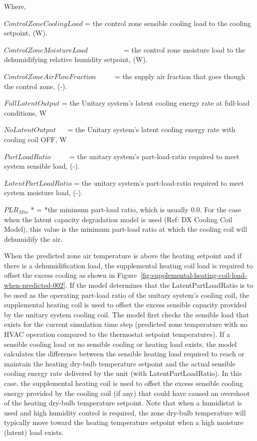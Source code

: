 Where,

\(ControlZoneCoolingLoad\) = the control zone sensible cooling load to the cooling setpoint, (W).

\(ControlZoneMoistureLoad\) ~~~~~~~~~ = the control zone moisture load to the dehumidifying relative humidity setpoint, (W).

\(ControlZoneAirFlowFraction\) ~~~~ = the supply air fraction that goes though the control zone, (-).

\(FullLatentOutput\) = the Unitary system's latent cooling energy rate at full-load conditions, W

\(NoLatentOutput\) ~~ = the Unitary system's latent cooling energy rate with cooling coil OFF, W

\(PartLoadRatio\) ~~~~ = the unitary system's part-load-ratio required to meet system sensible load, (-).

\(LatentPartLoadRatio\) = the unitary system's part-load-ratio required to meet system moisture load, (-).

\(PL{R_{Min}}\) * = *the minimum part-load ratio, which is usually 0.0. For the case when the latent capacity degradation model is used (Ref: DX Cooling Coil Model), this value is the minimum part-load ratio at which the cooling coil will dehumidify the air.

When the predicted zone air temperature is above the heating setpoint and if there is a dehumidification load, the supplemental heating coil load is required to offset the excess cooling as shown in Figure~\ref{fig:supplemental-heating-coil-load-when-predicted-002}. If the model determines that the LatentPartLoadRatio is to be used as the operating part-load ratio of the unitary system's cooling coil, the supplemental heating coil is used to offset the excess sensible capacity provided by the unitary system cooling coil. The model first checks the sensible load that exists for the current simulation time step (predicted zone temperature with no HVAC operation compared to the thermostat setpoint temperatures). If a sensible cooling load or no sensible cooling or heating load exists, the model calculates the difference between the sensible heating load required to reach or maintain the heating dry-bulb temperature setpoint and the actual sensible cooling energy rate delivered by the unit (with LatentPartLoadRatio). In this case, the supplemental heating coil is used to offset the excess sensible cooling energy provided by the cooling coil (if any) that could have caused an overshoot of the heating dry-bulb temperature setpoint. Note that when a humidistat is used and high humidity control is required, the zone dry-bulb temperature will typically move toward the heating temperature setpoint when a high moisture (latent) load exists.

